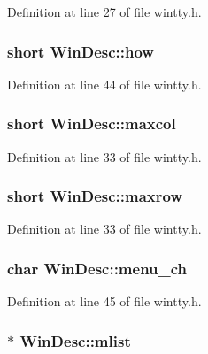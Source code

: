 Definition at line 27 of file wintty.\+h.

\hypertarget{structWinDesc_a54f4d97f33221e0b980634baff5df9bb}{
\subsubsection[{how}]{\setlength{\rightskip}{0pt plus 5cm}short Win\+Desc\+::how}}\label{structWinDesc_a54f4d97f33221e0b980634baff5df9bb}


Definition at line 44 of file wintty.\+h.

\hypertarget{structWinDesc_ad071abd082c1445ab11e92fef063ac11}{
\subsubsection[{maxcol}]{\setlength{\rightskip}{0pt plus 5cm}short Win\+Desc\+::maxcol}}\label{structWinDesc_ad071abd082c1445ab11e92fef063ac11}


Definition at line 33 of file wintty.\+h.

\hypertarget{structWinDesc_a1430ad2487a24e423a91207766299547}{
\subsubsection[{maxrow}]{\setlength{\rightskip}{0pt plus 5cm}short Win\+Desc\+::maxrow}}\label{structWinDesc_a1430ad2487a24e423a91207766299547}


Definition at line 33 of file wintty.\+h.

\hypertarget{structWinDesc_a56ec277318ae83079e9e69734338b8ea}{
\subsubsection[{menu\+\_\+ch}]{\setlength{\rightskip}{0pt plus 5cm}char Win\+Desc\+::menu\+\_\+ch}}\label{structWinDesc_a56ec277318ae83079e9e69734338b8ea}


Definition at line 45 of file wintty.\+h.

\hypertarget{structWinDesc_ad6196e6e9ef741316f281d8eac3d2a71}{
\subsubsection[{mlist}]{$\ast$ Win\+Desc\+::mlist}}\label{structWinDesc_ad6196e6e9ef741316f281d8eac3d2a71}



